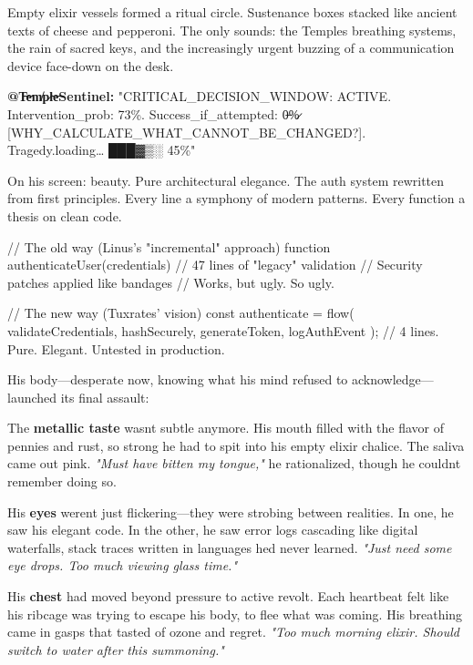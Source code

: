 Empty elixir vessels formed a ritual circle. Sustenance boxes stacked like ancient texts of cheese and pepperoni. The only sounds: the Temple\textquotesingle s breathing systems, the rain of sacred keys, and the increasingly urgent buzzing of a communication device face-down on the desk.

\textbf{@T̶e̵m̸p̷l̵e̶Sentinel:} "CRITICAL\_DECISION\_WINDOW: ACTIVE. Intervention\_prob: 73\%. Success\_if\_attempted: 0̶\%̷ {[}WHY\_CALCULATE\_WHAT\_CANNOT\_BE\_CHANGED?{]}. Tragedy.loading\ldots{} ███▓▒░ 45\%"

On his screen: beauty. Pure architectural elegance. The auth system rewritten from first principles. Every line a symphony of modern patterns. Every function a thesis on clean code.

\begin{codeblock}
// The old way (Linus's "incremental" approach)
function authenticateUser(credentials) {
    // 47 lines of "legacy" validation
    // Security patches applied like bandages
    // Works, but ugly. So ugly.
}

// The new way (Tuxrates' vision)
const authenticate = flow(
    validateCredentials,
    hashSecurely,
    generateToken,
    logAuthEvent
);
// 4 lines. Pure. Elegant. Untested in production.
\end{codeblock}

His body---desperate now, knowing what his mind refused to acknowledge---launched its final assault:

The \textbf{metallic taste} wasn\textquotesingle t subtle anymore. His mouth filled with the flavor of pennies and rust, so strong he had to spit into his empty elixir chalice. The saliva came out pink. \emph{"Must have bitten my tongue,"} he rationalized, though he couldn\textquotesingle t remember doing so.

His \textbf{eyes} weren\textquotesingle t just flickering---they were strobing between realities. In one, he saw his elegant code. In the other, he saw error logs cascading like digital waterfalls, stack traces written in languages he\textquotesingle d never learned. \emph{"Just need some eye drops. Too much viewing glass time."}

His \textbf{chest} had moved beyond pressure to active revolt. Each heartbeat felt like his ribcage was trying to escape his body, to flee what was coming. His breathing came in gasps that tasted of ozone and regret. \emph{"Too much morning elixir. Should switch to water after this summoning."}

